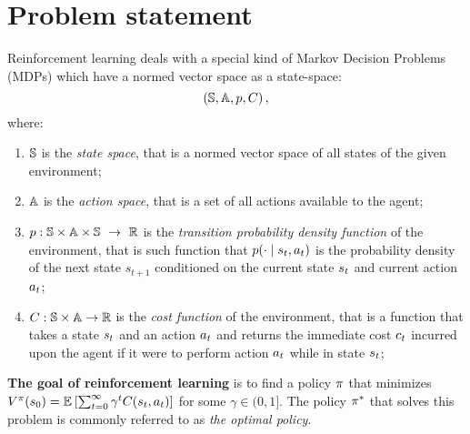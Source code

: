 \documentclass[12pt,twoside]{../../mitthesis}
\begin{document}
\section*{Problem statement}

Reinforcement learning deals with a special kind of Markov Decision Problems (MDPs) which have a normed vector space as a state-space:
\begin{equation}
\left(\mathbb S, \mathbb A, p, C \right),
\end{equation}
where:
\begin{enumerate}
\item $\mathbb S$ is the \textit{state space}, that is a normed vector space of all states of the given environment;
\item $\mathbb A$ is the \textit{action space}, that is a set of all actions available to the agent;
\item $p : \mathbb S \times \mathbb A \times \mathbb S \ \rightarrow \ {\mathbb{R}}$ is the \textit{transition probability density function} of the environment, that is such function that $p(\cdot \mid s_{t}, a_{t})$ is the probability density of the next state $s_{t + 1}$ conditioned on the current state $s_{t}$ and current action $a_{t}$;
\item $C : \mathbb S \times \mathbb A \rightarrow \mathbb{R}$ is the \textit{cost function} of the environment, that is a function that takes a state $s_{t}$ and an action $a_{t}$ and returns the immediate cost $c_{t}$ incurred upon the agent if it were to perform action $a_{t}$ while in state $s_{t}$;
\end{enumerate}
\textbf{The goal of reinforcement learning} is to find a policy $\pi$ that minimizes $V^{\pi}(s_0) = \mathbb E_{{}}\left[\sum_{t = 0}^{\infty}\gamma^{t}C(s_{t}, a_{t})\right]$ for some $\gamma \in (0, 1]$. The policy $\pi^{\ast}$ that solves this problem is commonly referred to as \textit{the optimal policy}.
\end{document}
